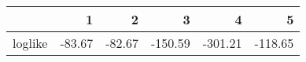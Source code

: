\begin{table}[ht]
\centering
\begin{tabular}{rrrrrr}
  \hline
 & 1 & 2 & 3 & 4 & 5 \\ 
  \hline
loglike & -83.67 & -82.67 & -150.59 & -301.21 & -118.65 \\ 
   \hline
\end{tabular}
\caption{} 
\label{fig audit.risk-5CV}
\end{table}
